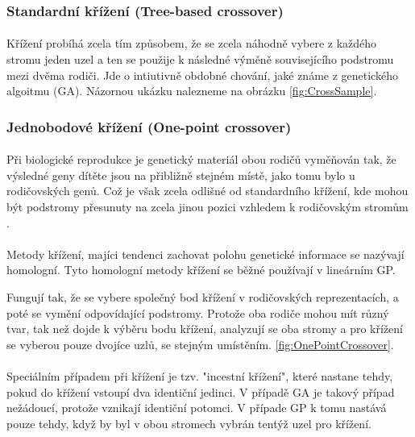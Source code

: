\documentclass[bc,male,java,dept460]{diploma}		%
\begin{document}
\subsubsection{Standardní křížení (Tree-based crossover)}
\paragraph*{}
Křížení probíhá zcela tím způsobem, že se zcela náhodně vybere z každého stromu jeden uzel a ten se použije k následné výměně souvisejícího podstromu mezi dvěma rodiči. Jde o intiutivně obdobné chování, jaké známe z genetického algoitmu (GA). Názornou ukázku nalezneme na obrázku \ref{fig:CrossSample}.

\subsubsection{Jednobodové křížení (One-point crossover)}
\paragraph*{}
Při biologické reprodukce je genetický materiál obou rodičů vyměňován tak, že výsledné geny dítěte jsou na přibližně stejném místě, jako tomu bylo u rodičovských genů. Což je však zcela odlišné od standardního křížení, kde mohou být podstromy přesunuty na zcela jinou pozici vzhledem k rodičovským stromům \cite{langdonpoli}.

\paragraph*{}
Metody křížení, majíci tendenci zachovat polohu genetické informace se nazývají homologní. Tyto homologní metody křížení se běžné používají v lineárním GP.

Fungují tak, že se vybere společný bod křížení v rodičovských reprezentacích, a poté se vymění odpovídající podstromy. Protože oba rodiče mohou mít různý tvar, tak než dojde k výběru bodu křížení, analyzují se oba stromy a pro křížení se vyberou pouze dvojíce uzlů, se stejným umístěním. \ref{fig:OnePointCrossover}.


\paragraph*{}
Speciálním případem při křížení je tzv. "incestní křížení", které nastane tehdy, pokud do křížení vstoupí dva identiční jedinci. V případě GA je takový případ nežádoucí, protože vznikají identiční potomci. V případe GP k tomu nastává pouze tehdy, když by byl v obou stromech vybrán tentýž uzel pro křížení.
\end{document}
